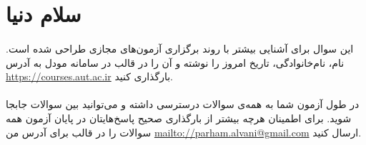\documentclass[../main.tex]{subfiles}
\begin{document}
\section{سلام دنیا}
\paragraph{}
این سوال برای آشنایی بیشتر با روند برگزاری آزمون‌های مجازی طراحی شده است.
نام، نام‌خانوادگی، تاریخ امروز را نوشته و آن را در قالب
در سامانه مودل به آدرس
\url{https://courses.aut.ac.ir}
بارگذاری کنید.

\paragraph{}
در طول آزمون شما به همه‌ی سوالات درسترسی داشته و می‌توانید بین سوالات جابجا شوید.
برای اطمینان هرچه بیشتر از بارگذاری صحیح پاسخ‌هایتان در پایان آزمون همه سوالات را در قالب
برای آدرس من
\url{mailto://parham.alvani@gmail.com}
ارسال کنید.
\end{document}

